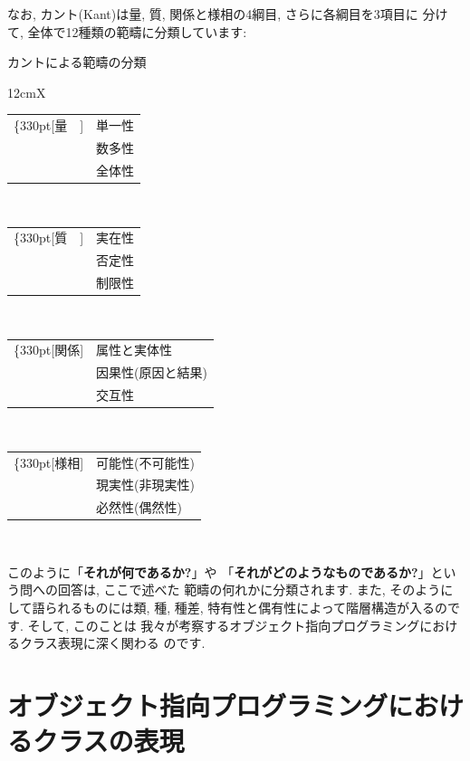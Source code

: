 なお, カント(Kant)は量, 質, 関係と様相の4綱目, さらに各綱目を3項目に
分けて, 全体で12種類の範疇に分類しています:


\begin{itembox}[c]{カントによる範疇の分類}
{\footnotesize
\begin{tabularx}{12cm}{X}
\begin{tabular}[t]{rl}
\ldelim\{{3}{30pt}[量　]&
単一性\\
&数多性\\
&全体性\\
\end{tabular}
\\
\begin{tabular}[t]{rl}
\ldelim\{{3}{30pt}[質　]&
実在性\\
&否定性\\
&制限性\\
\end{tabular}
\\
\begin{tabular}[t]{rl}
\ldelim\{{3}{30pt}[関係]&
属性と実体性\\
&因果性(原因と結果)\\
&交互性\\
\end{tabular}
\\
\begin{tabular}[t]{rl}
\ldelim\{{3}{30pt}[様相]&
可能性(不可能性)\\
&現実性(非現実性)\\
&必然性(偶然性)\\
\end{tabular}
\\
\end{tabularx}
}
\end{itembox}


このように「\textbf{それが何であるか?}」や
「\textbf{それがどのようなものであるか?}」という問への回答は, ここで述べた
範疇の何れかに分類されます. また, そのようにして語られるものには類, 種,
 種差, 特有性と偶有性によって階層構造が入るのです. そして, このことは
我々が考察するオブジェクト指向プログラミングにおけるクラス表現に深く関わる
のです.

\section{オブジェクト指向プログラミングにおけるクラスの表現}



